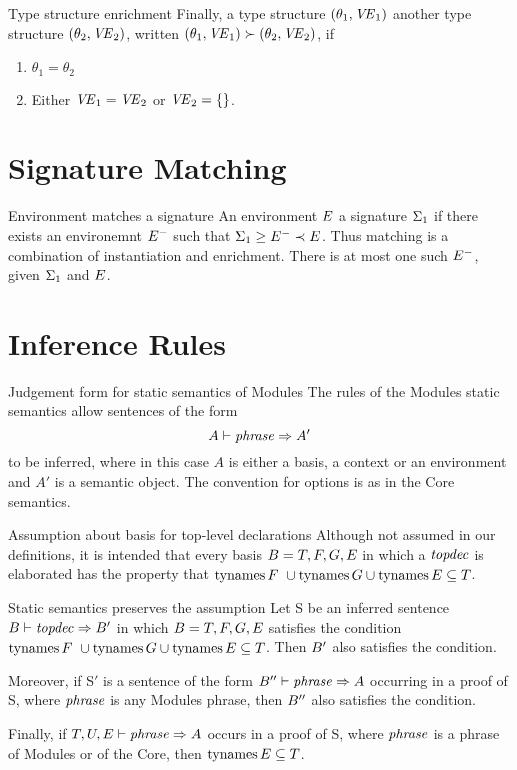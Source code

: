 \begin{definition}{Type structure enrichment}
Finally, a type structure $(\theta_{1},\textit{V\kern-.05emE\/}_{1})$
 another type structure $(\theta_{2},\textit{V\kern-.05emE\/}_{2})$,
written $(\theta_{1},\textit{V\kern-.05emE\/}_{1})\succ(\theta_{2},\textit{V\kern-.05emE\/}_{2})$,
if
\begin{enumerate}
\item $\theta_1=\theta_2$
\item Either $\textit{V\kern-.05emE\/}_{1}=\textit{V\kern-.05emE\/}_{2}$ or $\textit{V\kern-.05emE\/}_{2}=\{\}$.
\end{enumerate}
\end{definition}

\section{Signature Matching}

\begin{definition}{Environment matches a signature}
An environment $E$  a signature $\Sigma_{1}$ if there
exists an environemnt $E^{-}$ such that $\Sigma_{1}\geq E^{-}\prec E$.
Thus matching is a combination of instantiation and enrichment. There is
at most one such $E^{-}$, given $\Sigma_{1}$ and $E$.
\end{definition}

\section{Inference Rules}

\begin{clause}{Judgement form for static semantics of Modules}
The rules of the Modules static semantics allow
sentences of the form
\begin{equation*}
A\vdash\textit{phrase\/}\Rightarrow A'
\end{equation*}
to be inferred, where in this case $A$ is either a basis, a context or
an environment and $A'$ is a semantic object.  The convention for options
is as in the Core semantics. 
\end{clause}

\begin{clause}{Assumption about basis for top-level declarations}
Although not assumed in our definitions, it is intended that every basis
$B=T,F,G,E$ in which a $\textit{topdec\/}$ is elaborated has the property
that $\TyNamesFcn\F\ \cup\TyNamesFcn\G\cup\TyNamesFcn\E\subseteq\T$.
\end{clause}

\begin{theorem}{Static semantics preserves the assumption}
Let S be an inferred sentence $B\vdash\textit{topdec\/}\Rightarrow B'$ in which $B=T,F,G,E$ satisfies
the condition $\TyNamesFcn\F\ \cup\TyNamesFcn\G\cup\TyNamesFcn\E\subseteq\T$. Then $B'$ also satisfies the condition.

Moreover, if S$'$ is a sentence of the form
$B''\vdash\textit{phrase\/}\Rightarrow A$ occurring in a proof of S, where $\textit{phrase\/}$ is
any Modules phrase, then $B''$ also satisfies the condition.

Finally, if $T,U,E\vdash\textit{phrase\/}\Rightarrow A$ occurs
in a proof of S, where $\textit{phrase\/}$ is a phrase of Modules or of the Core, then
$\mathop{\rm tynames}\nolimits E\subseteq T$.
\end{theorem}

